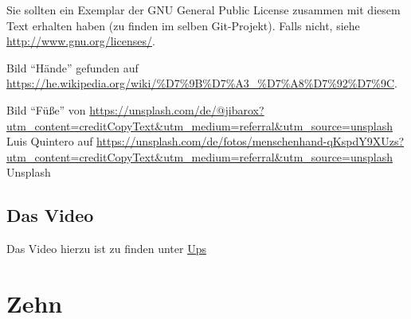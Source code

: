 \documentclass[a4paper]{amsart}
\theoremstyle{definition}
\begin{document}
Sie sollten ein Exemplar der GNU General Public License zusammen mit diesem Text erhalten haben 
(zu finden im selben Git-Projekt). 
Falls nicht, siehe \url{http://www.gnu.org/licenses/}.

Bild "`Hände"' gefunden auf \url{https://he.wikipedia.org/wiki/%D7%9B%D7%A3_%D7%A8%D7%92%D7%9C}.

Bild "`Füße"' von \url{https://unsplash.com/de/@jibarox?utm_content=creditCopyText\&utm_medium=referral\&utm_source=unsplash} Luis Quintero auf \url{https://unsplash.com/de/fotos/menschenhand-qKspdY9XUzs?utm\_content=creditCopyText\&utm_medium=referral\&utm\_source=unsplash} Unsplash

\subsection*{Das Video}
Das Video hierzu ist zu finden unter \url{Ups}

\section{Zehn}
\def\kategoryVspace{5pt}

\end{document}
